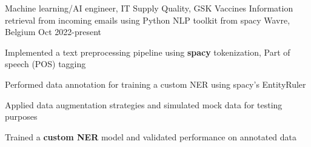 
\vspace{2mm}

\begin{cventries}
  \cventry
    {Machine learning/AI engineer, IT Supply Quality, GSK Vaccines} %
    {Information retrieval from incoming emails using Python NLP toolkit from spacy} %
    {Wavre, Belgium} %
    {Oct 2022-present} %
    {
    \begin{cvitems}
        \item Implemented a text preprocessing pipeline using \textbf{spacy} tokenization, Part of speech (POS) tagging
        \item Performed data annotation for training a custom NER using spacy's EntityRuler  
        \item Applied data augmentation strategies and simulated mock data for testing purposes       
        \item Trained a \textbf{custom NER} model and validated performance on annotated data
    \end{cvitems}
    }
\end{cventries}